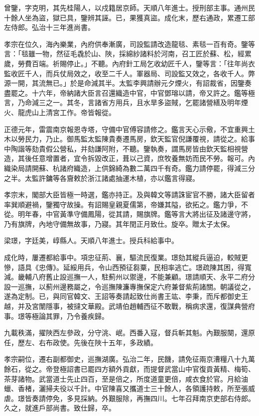 \begin{pinyinscope}
曾鑒，字克明，其先桂陽人，以戍籍居京師。天順八年進士。授刑部主事。通州民十餘人坐為盜，獄已具，鑒辨其誣。已，果獲真盜。成化末，歷右通政，累遷工部左侍郎。弘治十三年進尚書。

孝宗在位久，海內樂業，內府供奉漸廣，司設監請改造龍毯、素毯一百有奇。鑒等言：「毯雖一物，然征毛毳於山、陜，採綿紗諸料於河南，召工匠於蘇、松，經累歲，勞費百端。祈賜停止。」不聽。內府針工局乞收幼匠千人，鑒等言：「往年尚衣監收匠千人，而兵仗局效之，收至二千人。軍器局、司設監又效之，各收千人。弊源一開，其流無已。」於是命減其半。太監李興請辦元夕煙火，有詔裁省，因鑒奏盡罷之。十六年，帝納諸大臣言召還織造中官，中官鄧瑢以請，帝又許之。鑑等極言，乃命減三之一。其冬，言諸省方用兵，且水旱多盜賊，乞罷諸營繕及明年煙火、龍虎山上清宮工作。帝皆報從。

正德元年，雷震南京報恩寺塔，守備中官傅容請修之。鑑言天心示儆，不宜重興土木以勞民力，乃止。御馬監太監陳貴奏遷馬房，欽天監官倪謙覆視，請從之。給事中陶諧等劾貴假公營私，并劾謙阿附，不聽。鑒執奏，謂馬房皆由欽天監相視營造，其後任意增置者，宜令拆毀改正，葺以己資，庶牧養無妨而民不勞。報可。內織染局請開蘇、杭諸府織造，上供錦綺為數二萬四千有奇。鑑力請停罷，得減三分之半。太監許鏞等各齎敕於浙江諸處抽運木植，亦以鑑言得寢。

孝宗末，閣部大臣皆極一時選，鑑亦持正。及與韓文等請誅宦官不勝，諸大臣留者率巽順避禍，鑒獨守故操。有詔賜皇親夏儒第，帝嫌其隘，欲拓之。鑑力爭，不從。明年春，中官黃準守備鳳陽，從其請，賜旗牌。鑑等言大將出征及諸邊守將，乃有旗牌，內地守備無故事，乃寢。其年閏正月致仕。旋卒。贈太子太保。

梁璟，字廷美，崞縣人。天順八年進士。授兵科給事中。

成化時，屢遷都給事中。項忠征荊、襄，驅流民復業。璟劾其縱兵逼迫，較賊更慘，語具《忠傳》。延綏用兵，令山西預征芻粟，民相率逃亡。璟疏陳其困，得寬減。畿輔八府舊止設巡撫一人，駐薊州以禦邊，不能兼顧。璟請順天、永平二府分設一巡撫，以薊州邊務屬之，令巡撫陳濂專撫保定六府兼督紫荊諸關。朝議從之，遂為定制。已，與同官韓文、王詔等奏請起致仕尚書王竑、李秉，而斥都御史王越，并及宮闈隱事，被撻文華殿。武靖伯趙輔西征不敢戰，稱病求還，復謀典營府事。璟等極論其罪，乃令養疾歸。

九載秩滿，擢陜西左參政，分守洮、岷。西番入寇，督兵斬其魁。內艱服闋，還原任，歷左、右布政使。先後在陜十五年，多政績。

孝宗嗣位，遷右副都御史，巡撫湖廣。弘治二年，民饑，請免征兩京漕糧八十九萬餘石，從之。帝登極詔書已罷四方額外貢獻，而提督武當山中官復貢黃精、梅筍、茶芽諸物。武當道士先止四百，至是倍之，所度道童更倍，咸衣食於官。月給油蠟、香楮，灑掃夫役以千計。中官陳喜又攜道士三十餘人，各領護持敕，所至張威虐。璟皆奏請停免，多見採納。外艱服除，再撫四川。七年召拜南京吏部右侍郎。久之，就進戶部尚書。致仕歸，卒。


\end{pinyinscope}
